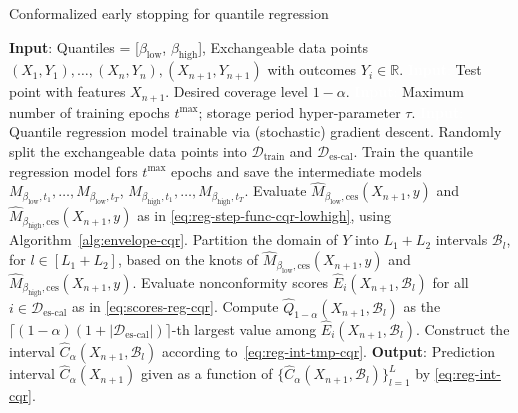 \begin{algorithm}[H]
    \color{blue}
    \caption{Conformalized early stopping for quantile regression}
    \label{alg:reg-cqr}
    \begin{algorithmic}[1]
        \STATE \textbf{Input}: Quantiles = [$\beta_{\text{low}}$, $\beta_{\text{high}}$], Exchangeable data points $(X_{1},Y_{1}), \ldots, (X_{n},Y_{n}), (X_{n+1},Y_{n+1})$ with outcomes $Y_i \in \mathbb{R}$.
        \STATE \textcolor{white}{\textbf{Input}:} Test point with features $X_{n+1}$. Desired coverage level $1-\alpha$.
        \STATE \textcolor{white}{\textbf{Input}:} Maximum number of training epochs $t^{\max}$; storage period hyper-parameter $\tau$.
        \STATE \textcolor{white}{\textbf{Input}:} Quantile regression model trainable via (stochastic) gradient descent.
        \STATE Randomly split the exchangeable data points into $\mathcal{D}_{\text{train}}$ and $\mathcal{D}_{\text{es-cal}}$.
        \STATE Train the quantile regression model fors $t^{\text{max}}$ epochs and save the intermediate models $M_{\beta_{\text{low}}, t_1} , \dots, M_{\beta_{\text{low}}, t_T}$, $M_{\beta_{\text{high}}, t_1} , \dots, M_{\beta_{\text{high}}, t_T}$.
        \STATE Evaluate $\hat{M}_{\beta_{\text{low}},\text{ces}}(X_{n+1},y)$ and $\hat{M}_{\beta_{\text{high}},\text{ces}}(X_{n+1},y)$ as in \eqref{eq:reg-step-func-cqr-lowhigh}, using Algorithm~\ref{alg:envelope-cqr}.
        \STATE Partition the domain of $Y$ into $L_1+L_2$ intervals $\mathcal{B}_l$, for $l \in [L_1+L_2]$, based on the knots of $\hat{M}_{\beta_{\text{low}},\text{ces}}(X_{n+1},y)$ and $\hat{M}_{\beta_{\text{high}},\text{ces}}(X_{n+1},y)$.
        \STATE Evaluate nonconformity scores $\hat{E}_i(X_{n+1},\mathcal{B}_l)$ for all $i \in \mathcal{D}_{\text{es-cal}}$ as in \eqref{eq:scores-reg-cqr}.
        \STATE Compute $\hat{Q}_{1-\alpha}(X_{n+1},\mathcal{B}_l)$ as the $\lceil (1-\alpha)(1+|\mathcal{D}_{\text{es-cal}}|) \rceil$-th largest value among $\hat{E}_i(X_{n+1},\mathcal{B}_l)$.
 \STATE Construct the interval $\hat{C}_{\alpha}(X_{n+1}, \mathcal{B}_l)$ according to~\eqref{eq:reg-int-tmp-cqr}.
        \ENDFOR
        \STATE \textbf{Output}: Prediction interval $\hat{C}_{\alpha}(X_{n+1})$ given as a function of $\{\hat{C}_{\alpha}(X_{n+1}, \mathcal{B}_l)\}_{l=1}^{L}$ by \eqref{eq:reg-int-cqr}.
    \end{algorithmic}
\end{algorithm}


